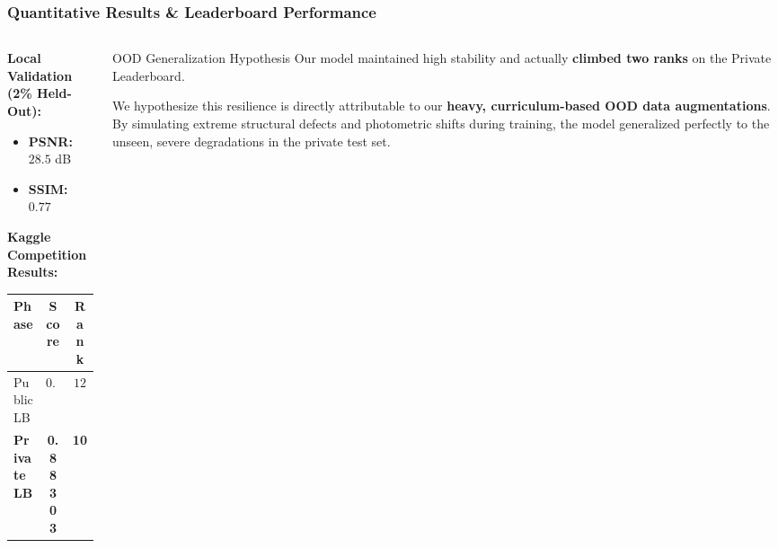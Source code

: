 \documentclass[aspectratio=169,xcolor=dvipsnames]{beamer}
\begin{document}
    \begin{frame}
        \frametitle{Quantitative Results \& Leaderboard Performance}
        \begin{columns}[T]
            \begin{column}{0.55\textwidth}
                \textbf{Local Validation (2\% Held-Out):}
                \begin{itemize}
                    \item \textbf{PSNR:} $28.5$ dB
                    \item \textbf{SSIM:} $0.77$
                \end{itemize}
                
                \vspace{1em}
                \textbf{Kaggle Competition Results:}
                \begin{table}[]
                    \centering
                    \renewcommand{\arraystretch}{1.3}
                    \begin{tabular}{l | c c}
                        \textbf{Phase} & \textbf{Score} & \textbf{Rank} \\
                        \hline
                        Public LB & $0.88614$ & $12$ \\
                        \textbf{Private LB} & \textbf{0.88303} & \textbf{10} \\
                    \end{tabular}
                \end{table}
            \end{column}
            \begin{column}{0.45\textwidth}
                \vspace{1em}
                \begin{block}{OOD Generalization Hypothesis}
                    Our model maintained high stability and actually \textbf{climbed two ranks} on the Private Leaderboard. 
                    
                    \vspace{0.5em}
                    We hypothesize this resilience is directly attributable to our \textbf{heavy, curriculum-based OOD data augmentations}. By simulating extreme structural defects and photometric shifts during training, the model generalized perfectly to the unseen, severe degradations in the private test set.
                \end{block}
            \end{column}
        \end{columns}
    \end{frame}
\end{document}

